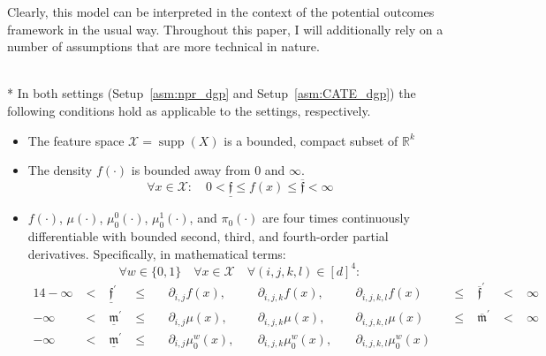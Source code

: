 Clearly, this model can be interpreted in the context of the potential outcomes framework in the usual way.
Throughout this paper, I will additionally rely on a number of assumptions that are more technical in nature.
\begin{boxD}
	\begin{asm}\label{asm:technical}\mbox{}\\*
		In both settings (Setup~\ref{asm:npr_dgp} and Setup~\ref{asm:CATE_dgp}) the following conditions hold as applicable to the settings, respectively.
		\begin{itemize}
			\item The feature space $\mathcal{X} = \operatorname{supp}(X)$ is a bounded, compact subset of $\mathbb{R}^k$
			\item The density $f(\cdot)$ is bounded away from 0 and $\infty$.
            \begin{equation}
                \forall x \in \mathcal{X}: \quad 0 < \underline{\mathfrak{f}} \leq f(x) \leq \overline{\mathfrak{f}} < \infty
            \end{equation}
			\item $f(\cdot)$, $\mu(\cdot)$, $\mu_{0}^{0}(\cdot)$, $\mu_{0}^{1}(\cdot)$, and $\pi_{0}(\cdot)$ are four times continuously differentiable with bounded second, third, and fourth-order partial derivatives. Specifically, in mathematical terms: 
            \begin{equation}
            \forall w\in \{0,1\} \quad \forall x \in \mathcal{X} \quad \forall (i,j,k,l) \in [d]^{4}:
            \end{equation}
            \vspace{-0.8cm}
            \begin{alignat*}{14}
                -\infty & \; < \; & \underline{\mathfrak{f}}^{\prime} 
                & \; \leq \; && \partial_{i,j} f(x), \; && \partial_{i,j,k} f(x), \; && \partial_{i,j,k,l} f(x) && \; \leq \; & \overline{\mathfrak{f}}^{\prime} & \; < \; & \infty \\
                -\infty & \; < \; & \underline{\mathfrak{m}}^{\prime} 
                & \; \leq \; && \partial_{i,j} \mu(x), \; && \partial_{i,j,k} \mu(x), \; && \partial_{i,j,k,l} \mu(x)
                && \; \leq \; & \overline{\mathfrak{m}}^{\prime} & \; < \; & \infty \\
                -\infty & \; < \; & \underline{\mathfrak{m}}^{\prime} 
                & \; \leq \; && \partial_{i,j} \mu_{0}^{w}(x), \; && \partial_{i,j,k} \mu_{0}^{w}(x), \; && \partial_{i,j,k,l} \mu_{0}^{w}(x)

\end{alignat*}
\end{itemize}
\end{asm}
\end{boxD}
